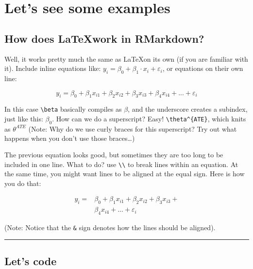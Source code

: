 \documentclass[
]{article}
\begin{document}
\hypertarget{lets-see-some-examples}{%
\section{Let's see some examples}\label{lets-see-some-examples}}

\hypertarget{how-does-work-in-rmarkdown}{%
\subsection{\texorpdfstring{How does \LaTeX work in
RMarkdown?}{How does work in RMarkdown?}}\label{how-does-work-in-rmarkdown}}

Well, it works pretty much the same as \LaTeX on its own (if you are
familiar with it). Include inline equations like:
\(y_i = \beta_0 + \beta_1\cdot x_i + \varepsilon_i\), or equations on
their own line:

\[y_i = \beta_0 + \beta_1 x_{i1} + \beta_2 x_{i2} + \beta_3 x_{i3} + \beta_4 x_{i4} + ... + \varepsilon_{i}\]

In this case \texttt{\textbackslash{}beta} basically compiles as
\(\beta\), and the underscore creates a subindex, just like this:
\(\beta_0\). How can we do a superscript? Easy!
\texttt{\textbackslash{}theta\^{}\{ATE\}}, which knits as
\(\theta^{ATE}\) (Note: Why do we use curly braces for this superscript?
Try out what happens when you don't use those braces\ldots)

The previous equation looks good, but sometimes they are too long to be
included in one line. What to do? use
\texttt{\textbackslash{}\textbackslash{}} to break lines within an
equation. At the same time, you might want lines to be aligned at the
equal sign. Here is how you do that:

\[\begin{aligned}
y_i =& \beta_0 + \beta_1 x_{i1} + \beta_2 x_{i2} + \beta_3 x_{i3} +\\
    &\beta_4 x_{i4} + ... + \varepsilon_{i}
\end{aligned}\]

(Note: Notice that the \texttt{\&} sign denotes how the lines should be
aligned).

\begin{center}\rule{0.5\linewidth}{0.5pt}\end{center}

\hypertarget{lets-code}{%
\subsection{Let's code}\label{lets-code}}
\end{document}
